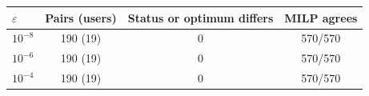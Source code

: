 \begin{tabular}{lccc}
\toprule
$\varepsilon$ & Pairs (users) & Status or optimum differs & MILP agrees \\
\midrule
$10^{-8}$ & 190 (19) & 0 & 570/570 \\
$10^{-6}$ & 190 (19) & 0 & 570/570 \\
$10^{-4}$ & 190 (19) & 0 & 570/570 \\
\bottomrule
\end{tabular}
